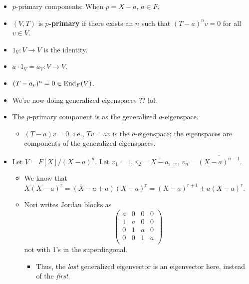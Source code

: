 \documentclass[../notes.tex]{subfiles}
\begin{document}
\begin{itemize}
    \item $p$-primary components: When $p=X-a$, $a\in F$.
    \item $(V,T)$ is \textbf{$p$-primary} if there exists an $n$ such that $(T-a)^nv=0$ for all $v\in V$.
    \item $1_V:V\to V$ is the identity.
    \item $a\cdot 1_V=a_V:V\to V$.
    \item $(T-a_v)^n=0\in\operatorname{End}_F(V)$.
    \item We're now doing generalized eigenspaces ?? lol.
    \item The $p$-primary component is as the generalized $a$-eigenspace.
    \begin{itemize}
        \item $(T-a)v=0$, i.e., $Tv=av$ is the $a$-eigenspace; the eigenspaces are components of the generalized eigenspaces.
    \end{itemize}
    \item Let $V=F[X]/(X-a)^n$. Let $v_1=1$, $v_2=\overline{X-a}$, \dots, $v_n=\overline{(X-a)^{n-1}}$.
    \begin{itemize}
        \item We know that $X(X-a)^r=(X-a+a)(X-a)^r=(X-a)^{r+1}+a(X-a)^r$.
        \item Nori writes Jordan blocks as
        \begin{equation*}
            \begin{pmatrix}
                a & 0 & 0 & 0\\
                1 & a & 0 & 0\\
                0 & 1 & a & 0\\
                0 & 0 & 1 & a\\
            \end{pmatrix}
        \end{equation*}
        not with 1's in the superdiagonal.
        \begin{itemize}
            \item Thus, the \emph{last} generalized eigenvector is an eigenvector here, instead of the \emph{first}.
        \end{itemize}
    \end{itemize}
\end{itemize}
\end{document}
